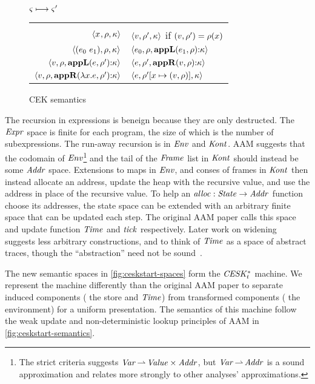 \begin{figure}
  \centering
  $\varsigma \longmapsto \varsigma'$ \\
  \begin{tabular}{r|l}
    \hline\vspace{-3mm}\\
    $\langle x^{{}}, \rho, \kappa \rangle$
    &
    $\langle v, \rho', \kappa \rangle$ if $(v,\rho') = \rho(x)$
    \\
    $\langle (e_{0}\ e_{1}){},\rho,\kappa \rangle$
    &
    $\langle e_{0},\rho,\mathbf{appL}(e_{1},\rho){\tt :} \kappa \rangle$
    \\
    $\langle v,\rho, \mathbf{appL}(e,\rho'){\tt :} \kappa \rangle$
    &
    $\langle e,\rho',\mathbf{appR}(v,\rho){\tt :} \kappa \rangle$
    \\
    $\langle v,\rho,\mathbf{appR}(\lambda{} x. e,\rho'){\tt :} \kappa \rangle$
    &
    $\langle e,\rho'[x\mapsto(v,\rho)],\kappa \rangle$
  \end{tabular}
  \caption{CEK semantics}
  \label{fig:cek-semantics}
\end{figure}

The recursion in expressions is beneign because they are only destructed. The $\mathit{Expr}$ space is finite for each program, the size of which is the number of subexpressions.
%
The run-away recursion is in $\mathit{Env}$ and $\mathit{Kont}$.
%
AAM suggests that the codomain of $\mathit{Env}$\footnote{The strict criteria suggests $\mathit{Var} \operatorname*{\rightharpoonup} \mathit{Value} \times \mathit{Addr}$, but $\mathit{Var} \operatorname*{\rightharpoonup} \mathit{Addr}$ is a sound approximation and relates more strongly to other analyses' approximations.} and the tail of the $\mathit{Frame}$ list in $\mathit{Kont}$ should instead be some $\mathit{Addr}$ space.
%
Extensions to maps in $\mathit{Env}$, and conses of frames in $\mathit{Kont}$ then instead allocate an address, update the heap with the recursive value, and use the address in place of the recursive value.
%
To help an $\mathit{alloc} : \mathit{State} \to \mathit{Addr}$ function choose its addresses, the state space can be extended with an arbitrary finite space that can be updated each step.
%
The original AAM paper calls this space and update function $\mathit{Time}$ and $\mathit{tick}$ respectively.
%
Later work on widening~\citep{ianjohnson:DBLP:conf/vmcai/HardekopfWCK14} suggests less arbitrary constructions, and to think of $\mathit{Time}$ as a space of abstract traces, though the ``abstraction'' need not be sound~\citep{dvanhorn:Might2009Posteriori}.

The new semantic spaces in \autoref{fig:ceskstart-spaces} form the $\mathit{CESK^*_t}$ machine.
%
We represent the machine differently than the original AAM paper to separate induced components (\eg{} the store and $\mathit{Time}$) from transformed components (\eg{} the environment) for a uniform presentation.
%
The semantics of this machine follow the weak update and non-deterministic lookup principles of AAM in \autoref{fig:ceskstart-semantics}.

